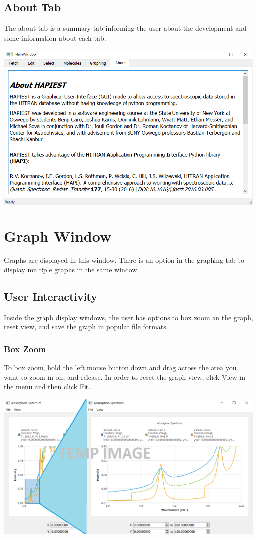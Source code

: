 \documentclass[12pt]{article}
\begin{document}
\subsection{About Tab}
The about tab is a summary tab informing the user about the development and some information about each tab.
\begin{center}
\includegraphics[scale = 0.5]{MainWindow_About}
\end{center}
\newpage

\section{Graph Window}
Graphs are displayed in this window. There is an option in the graphing tab to display multiple graphs in the same window.

\subsection{User Interactivity}
Inside the graph display windows, the user has options to box zoom on the graph, reset view, and save the graph in popular file formats. 

\subsubsection*{Box Zoom}
To box zoom, hold the left mouse button down and drag across the area you want to zoom in on, and release. In order to reset the graph view, click View in the menu and then click Fit.
\begin{center}
\includegraphics[scale = 0.5]{GraphDemo}
\end{center}
\end{document}
